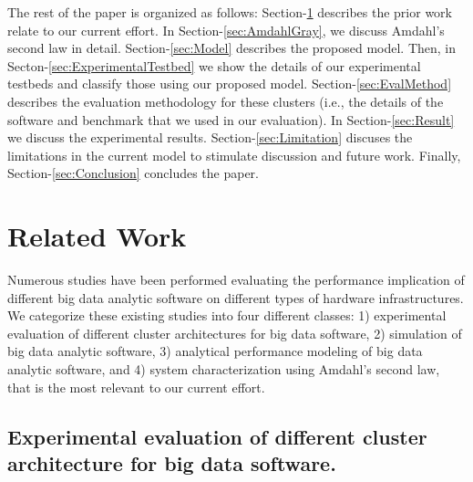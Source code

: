 \documentclass[journal]{IEEEtran}
\begin{document}
The rest of the paper is organized as follows: Section-\ref{sec:RelatedWork} describes the prior work relate to our current effort. In Section-\ref{sec:AmdahlGray}, we discuss Amdahl's second law in detail. Section-\ref{sec:Model} describes the proposed model. Then, in Secton-\ref{sec:ExperimentalTestbed} we show the details of our experimental testbeds and classify those using our proposed model. Section-\ref{sec:EvalMethod} describes the evaluation methodology for these clusters (i.e., the details of the software and benchmark that we used in our evaluation). In Section-\ref{sec:Result} we discuss the experimental results. Section-\ref{sec:Limitation} discuses the limitations in the current model to stimulate discussion and future work. Finally, Section-\ref{sec:Conclusion} concludes the paper.

\section{Related Work} \label{sec:RelatedWork}
Numerous studies have been performed evaluating the performance implication of different big data analytic software on different types of hardware infrastructures. We categorize these existing studies into four different classes: 1) experimental evaluation of different cluster architectures for big data software, 2) simulation of big data analytic software, 3) analytical performance modeling of big data analytic software, and 4) system characterization using Amdahl's second law, that is the most relevant to our current effort. %

\subsection{Experimental evaluation of different cluster architecture for big data software.}  %
\end{document}
